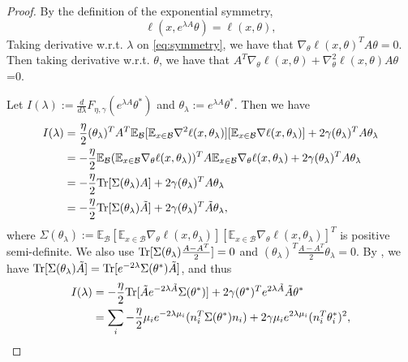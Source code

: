 \documentclass{article}
\theoremstyle{plain}
\newcommand{\Tr}{{\rm Tr}}
\begin{document}
\begin{proof}

By the definition of the exponential symmetry,
\begin{equation}
\ell(x,e^{\lambda A}\theta)=\ell(x,\theta),\label{eq:symmetry}
\end{equation}
Taking derivative w.r.t. $\lambda$ on \eqref{eq:symmetry}, we have that $\nabla_\theta\ell(x,\theta)^TA\theta=0$. Then taking derivative w.r.t. $\theta$, we have that $A^T\nabla_\theta\ell(x,\theta)+\nabla^2_\theta\ell(x,\theta)A\theta$=0.
 
Let $I(\lambda):=\frac{d}{d\lambda}F_{\eta,\gamma}(e^{\lambda A}\theta^*)$ and $\theta_\lambda:=e^{\lambda A}\theta^*$. Then we have
\begin{equation}
\begin{aligned}
I(\lambda)&=\frac{\eta}{2}(\theta_\lambda)^TA^T\mathbb{E}_\mathcal{B
}[\mathbb{E}_{x\in\mathcal{B}}\nabla^2\ell(x,\theta_\lambda)][\mathbb{E}_{x\in\mathcal{B}}\nabla \ell(x,\theta_\lambda)]+2\gamma(\theta_\lambda)^TA\theta_\lambda\\
&=-\frac{\eta}{2}\mathbb{E}_\mathcal{B}(\mathbb{E}_{x\in\mathcal{B}}\nabla_\theta\ell(x,\theta_\lambda))^TA\mathbb{E}_{x\in\mathcal{B}}\nabla_\theta\ell(x,\theta_\lambda)+2\gamma(\theta_\lambda)^TA\theta_\lambda\\
&=-\frac{\eta}{2}\Tr[\Sigma(\theta_\lambda)A]+2\gamma(\theta_\lambda)^TA\theta_\lambda\\
&=-\frac{\eta}{2}\Tr[\Sigma(\theta_\lambda)\tilde{A}]+2\gamma(\theta_\lambda)^T\tilde{A}\theta_\lambda,
\end{aligned}
\end{equation}
where $\Sigma(\theta_\lambda):=\mathbb{E}_\mathcal{B}[\mathbb{E}_{x\in\mathcal{B}}\nabla_\theta\ell(x,\theta_\lambda)][\mathbb{E}_{x\in\mathcal{B}}\nabla_\theta\ell(x,\theta_\lambda)]^T$ is positive semi-definite. We also use $\Tr[\Sigma(\theta_\lambda)\frac{A-A^T}{2}]=0$ and $(\theta_\lambda)^T\frac{A-A^T}{2}\theta_\lambda=0$. By \cite[Lemma B.1]{ziyin2024parameter}, we have $\Tr[\Sigma(\theta_\lambda)\tilde{A}]=\Tr[e^{-2\lambda}\Sigma(\theta^*)\tilde{A}]$, and thus
\begin{equation}
\begin{aligned}
I(\lambda)&=-\frac{\eta}{2}\Tr[\tilde{A}e^{-2\lambda \tilde{A}}\Sigma(\theta^*)]+2\gamma(\theta^*)^Te^{2\lambda \tilde{A}}\tilde{A}\theta^*\\
&=\sum_i-\frac{\eta}{2}\mu_ie^{-2\lambda\mu_i}(n_i^T\Sigma(\theta^*)n_i)+2\gamma\mu_ie^{2\lambda\mu_i}(n_i^T\theta_i^*)^2,

\end{aligned}
\end{equation}
\end{proof}
\end{document}
